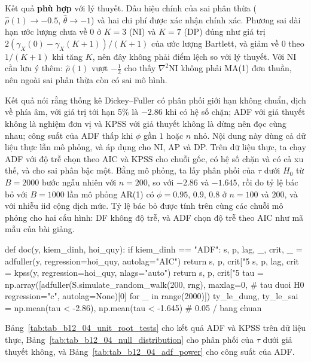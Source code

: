  Kết quả \textbf{phù hợp} với lý thuyết. Dấu hiệu chính của sai phân thừa ($\hat\rho(1)\to-0.5$, $\hat\theta\to-1$) và hai chi phí được xác nhận chính xác. Phương sai dài hạn ước lượng chưa về $0$ ở $K=3$ (NI) và $K=7$ (DP) đúng như giá trị $2(\gamma_X(0)-\gamma_X(K+1))/(K+1)$ của ước lượng Bartlett, và giảm về $0$ theo $1/(K+1)$ khi tăng $K$, nên đây không phải điểm lệch so với lý thuyết. Với NI cần lưu ý thêm: $\hat\rho(1)$ vượt $-\tfrac12$ cho thấy $\nabla^2$NI không phải MA(1) đơn thuần, nên ngoài sai phân thừa còn có sai mô hình.

 Kết quả  nói rằng thống kê Dickey--Fuller có phân phối giới hạn không chuẩn, dịch về phía âm, với giá trị tới hạn 5\% là $-2.86$ khi có hệ số chặn; ADF với giả thuyết không là nghiệm đơn vị và KPSS với giả thuyết không là dừng nên đọc cùng nhau; công suất của ADF thấp khi $\phi$ gần $1$ hoặc $n$ nhỏ.
 Nội dung này dùng cả dữ liệu thực lẫn mô phỏng, và áp dụng cho NI, AP và DP. Trên dữ liệu thực, ta chạy ADF với độ trễ chọn theo AIC và KPSS cho chuỗi gốc, có hệ số chặn và có cả xu thế, và cho sai phân bậc một. Bằng mô phỏng, ta lấy phân phối của $\tau$ dưới $H_0$ từ $B=2000$ bước ngẫu nhiên với $n=200$, so với $-2.86$ và $-1.645$, rồi đo tỷ lệ bác bỏ với $B=1000$ lần mô phỏng AR(1) có $\phi=0.95,\,0.9,\,0.8$ ở $n=100$ và $200$, và với nhiễu iid cộng dịch mức. Tỷ lệ bác bỏ được tính trên cùng các chuỗi mô phỏng cho hai cấu hình: DF không độ trễ, và ADF chọn độ trễ theo AIC như mã mẫu của bài giảng.
\begin{codeblock}
def doc(y, kiem_dinh, hoi_quy):
    if kiem_dinh == "ADF":
        s, p, lag, _, crit, _ = adfuller(y, regression=hoi_quy, autolag="AIC")
        return s, p, crit["5%
    s, p, lag, crit = kpss(y, regression=hoi_quy, nlags="auto")
    return s, p, crit["5%
tau = np.array([adfuller(S.simulate_random_walk(200, rng), maxlag=0,       # tau duoi H0
                         regression="c", autolag=None)[0] for _ in range(2000)])
ty_le_dung, ty_le_sai = np.mean(tau < -2.86), np.mean(tau < -1.645)       # 0.05 / bang chuan
\end{codeblock}
 Bảng~\ref{tab:tab_b12_04_unit_root_tests} cho kết quả ADF và KPSS trên dữ liệu thực, Bảng~\ref{tab:tab_b12_04_null_distribution} cho phân phối của $\tau$ dưới giả thuyết không, và Bảng~\ref{tab:tab_b12_04_adf_power} cho công suất của ADF.
